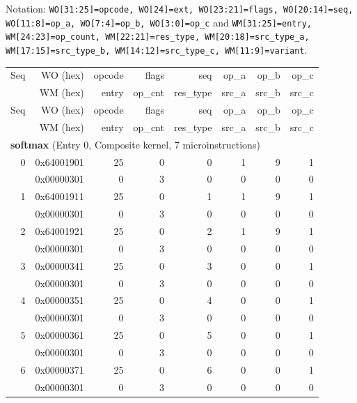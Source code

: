 Notation: \texttt{WO[31:25]=opcode, WO[24]=ext, WO[23:21]=flags, WO[20:14]=seq, WO[11:8]=op\_a, WO[7:4]=op\_b, WO[3:0]=op\_c} and \texttt{WM[31:25]=entry, WM[24:23]=op\_count, WM[22:21]=res\_type, WM[20:18]=src\_type\_a, WM[17:15]=src\_type\_b, WM[14:12]=src\_type\_c, WM[11:9]=variant}.

\scriptsize
\begin{longtable}{r r r r r r r r}
\toprule
Seq & WO (hex) & opcode & flags & seq & op\_a & op\_b & op\_c \\
    & WM (hex) & entry & op\_cnt & res\_type & src\_a & src\_b & src\_c \\
\midrule
\endfirsthead
\toprule
Seq & WO (hex) & opcode & flags & seq & op\_a & op\_b & op\_c \\
    & WM (hex) & entry & op\_cnt & res\_type & src\_a & src\_b & src\_c \\
\midrule
\endhead

\multicolumn{8}{l}{\textbf{softmax} (Entry 0, Composite kernel, 7 microinstructions)} \\
0 & 0x64001901 & 25 & 0 & 0 & 1 & 9 & 1 \\
  & 0x00000301 & 0 & 3 & 0 & 0 & 0 & 0 \\
1 & 0x64001911 & 25 & 0 & 1 & 1 & 9 & 1 \\
  & 0x00000301 & 0 & 3 & 0 & 0 & 0 & 0 \\
2 & 0x64001921 & 25 & 0 & 2 & 1 & 9 & 1 \\
  & 0x00000301 & 0 & 3 & 0 & 0 & 0 & 0 \\
3 & 0x00000341 & 25 & 0 & 3 & 0 & 0 & 1 \\
  & 0x00000301 & 0 & 3 & 0 & 0 & 0 & 0 \\
4 & 0x00000351 & 25 & 0 & 4 & 0 & 0 & 1 \\
  & 0x00000301 & 0 & 3 & 0 & 0 & 0 & 0 \\
5 & 0x00000361 & 25 & 0 & 5 & 0 & 0 & 1 \\
  & 0x00000301 & 0 & 3 & 0 & 0 & 0 & 0 \\
6 & 0x00000371 & 25 & 0 & 6 & 0 & 0 & 1 \\
  & 0x00000301 & 0 & 3 & 0 & 0 & 0 & 0 \\


\end{longtable}
